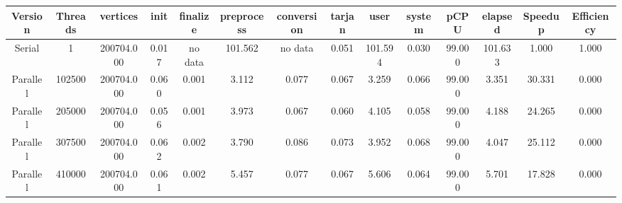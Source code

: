 \begin{tabular}{|c|c|c|c|c|c|c|c|c|c|c|c|c|c|}
\toprule
 Version &  Threads &   vertices &  init & finalize &  preprocess & conversion &  tarjan &    user &  system &   pCPU &  elapsed &  Speedup &  Efficiency \\
\midrule
  Serial &        1 & 200704.000 & 0.017 &  no data &     101.562 &    no data &   0.051 & 101.594 &   0.030 & 99.000 &  101.633 &    1.000 &       1.000 \\
Parallel &   102500 & 200704.000 & 0.060 &    0.001 &       3.112 &      0.077 &   0.067 &   3.259 &   0.066 & 99.000 &    3.351 &   30.331 &       0.000 \\
Parallel &   205000 & 200704.000 & 0.056 &    0.001 &       3.973 &      0.067 &   0.060 &   4.105 &   0.058 & 99.000 &    4.188 &   24.265 &       0.000 \\
Parallel &   307500 & 200704.000 & 0.062 &    0.002 &       3.790 &      0.086 &   0.073 &   3.952 &   0.068 & 99.000 &    4.047 &   25.112 &       0.000 \\
Parallel &   410000 & 200704.000 & 0.061 &    0.002 &       5.457 &      0.077 &   0.067 &   5.606 &   0.064 & 99.000 &    5.701 &   17.828 &       0.000 \\
\bottomrule
\end{tabular}
